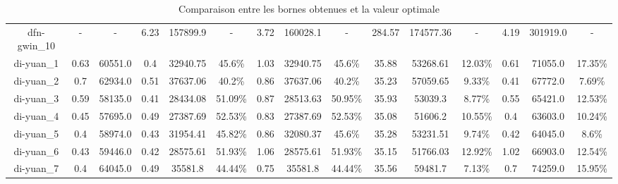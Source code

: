 \documentclass[main.tex]{subfiles}
\begin{document}
\begin{landscape}
\begin{table}[h]
{\begin{tabular}{c|cc|ccc|ccc|ccc|ccc}
	dfn-gwin\_10 &- &- &6.23 &157899.9 &- &3.72 &160028.1 &- &284.57 &174577.36 &- &4.19 &301919.0 &-\\
	di-yuan\_1 &0.63 &60551.0 &0.4 &32940.75 &45.6\% &1.03 &32940.75 &45.6\% &35.88 &53268.61 &12.03\% &0.61 &71055.0 &17.35\%\\
	di-yuan\_2 &0.7 &62934.0 &0.51 &37637.06 &40.2\% &0.86 &37637.06 &40.2\% &35.23 &57059.65 &9.33\% &0.41 &67772.0 &7.69\%\\
	di-yuan\_3 &0.59 &58135.0 &0.41 &28434.08 &51.09\% &0.87 &28513.63 &50.95\% &35.93 &53039.3 &8.77\% &0.55 &65421.0 &12.53\%\\
	di-yuan\_4 &0.45 &57695.0 &0.49 &27387.69 &52.53\% &0.83 &27387.69 &52.53\% &35.08 &51606.2 &10.55\% &0.4 &63603.0 &10.24\%\\
	di-yuan\_5 &0.4 &58974.0 &0.43 &31954.41 &45.82\% &0.86 &32080.37 &45.6\% &35.28 &53231.51 &9.74\% &0.42 &64045.0 &8.6\%\\
	di-yuan\_6 &0.43 &59446.0 &0.42 &28575.61 &51.93\% &1.06 &28575.61 &51.93\% &35.15 &51766.03 &12.92\% &1.02 &66903.0 &12.54\%\\
	di-yuan\_7 &0.4 &64045.0 &0.49 &35581.8 &44.44\% &0.75 &35581.8 &44.44\% &35.56 &59481.7 &7.13\% &0.7 &74259.0 &15.95\%\\
    \end{tabular}
}
\caption{Comparaison entre les bornes obtenues et la valeur optimale}
\end{table}
\end{landscape}
\newpage
\thispagestyle{empty}
\end{document}
